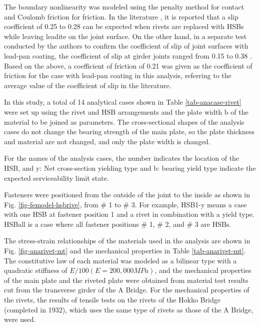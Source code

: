 The boundary nonlinearity was modeled using the penalty method for contact and Coulomb friction for friction. In the literature \cite{rtri1992Manual}, it is reported that a slip coefficient of 0.25 to 0.28 can be expected when rivets are replaced with \ac{HSB}s while leaving leadite on the joint surface. On the other hand, in a separate test conducted by the authors to confirm the coefficient of slip of joint surfaces with lead-pan coating, the coefficient of slip at girder joints ranged from 0.15 to 0.38 \cite{Chen2021}. Based on the above, a coefficient of friction of 0.21 was given as the coefficient of friction for the case with lead-pan coating in this analysis, referring to the average value of the coefficient of slip in the literature.

In this study, a total of 14 analytical cases shown in Table \ref{tab-anacase-rivet} were set up using the rivet and \ac{HSB} arrangements and the plate width b of the material to be joined as parameters. The cross-sectional shapes of the analysis cases do not change the bearing strength of the main plate, so the plate thickness and material are not changed, and only the plate width is changed.

For the names of the analysis cases, the number indicates the location of the \ac{HSB}, and y: Net cross-section yielding type and b: bearing yield type indicate the expected serviceability limit state. 

\ac{Fasteners} were positioned from the outside of the joint to the inside as shown in Fig. \ref{fig-femodel-hsbrive}, from \# 1 to \# 3. For example, HSB1-y means a case with one \ac{HSB} at fastener position 1 and a rivet in combination with a yield type. HSBall is a case where all fastener positions \# 1, \# 2, and \# 3 are \ac{HSB}s.

The stress-strain relationships of the materials used in the analysis are shown in Fig. \ref{fig-anarivet-mt} and the mechanical properties in Table \ref{tab-anarivet-mt}. The constitutive law of each material was modeled as a bilinear type with a quadratic stiffness of $E/100 (E=200,000 MPa)$, and the mechanical properties of the main plate and the riveted plate were obtained from material test results cut from the transverse girder of the A Bridge. For the mechanical properties of the rivets, the results of tensile tests \cite{KOMATSU2015} on the rivets of the Hokko Bridge (completed in 1932), which uses the same type of rivets as those of the A Bridge, were used.


